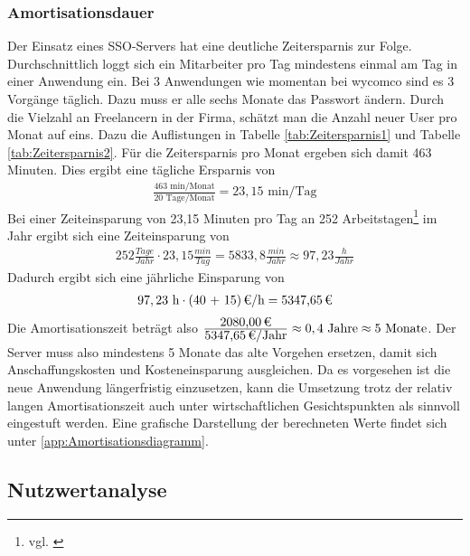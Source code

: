 \subsubsection{Amortisationsdauer}
\label{sec:Amortisationsdauer}

Der Einsatz eines \ac{SSO}-Servers hat eine deutliche Zeitersparnis zur Folge. Durchschnittlich loggt sich ein Mitarbeiter pro Tag mindestens einmal am Tag in einer Anwendung ein. Bei 3 Anwendungen wie momentan bei wycomco sind es 3 Vorgänge täglich. Dazu muss er alle sechs Monate das Passwort ändern. Durch die Vielzahl an Freelancern in der Firma, schätzt man die Anzahl neuer User pro Monat auf eins. 
Dazu die Auflistungen in Tabelle \ref{tab:Zeitersparnis1} und Tabelle \ref{tab:Zeitersparnis2}.
Für die Zeitersparnis pro Monat ergeben sich damit 463 Minuten. 
Dies ergibt eine tägliche Ersparnis von
\begin{eqnarray}
\frac{463 \mbox{ min/Monat}}{20 \mbox{ Tage/Monat}} = 23,15 \mbox{ min/Tag}
\end{eqnarray}
Bei einer Zeiteinsparung von 23,15 Minuten pro Tag an 252 Arbeitstagen\footnote{vgl. \cite{arbeitstage}} im Jahr ergibt sich eine Zeiteinsparung von 
\begin{eqnarray}
252 \frac{Tage}{Jahr} \cdot 23,15 \frac{min}{Tag} = 5833,8 \frac{min}{Jahr} \approx 97,23 \frac{h}{Jahr} 
\end{eqnarray}
Dadurch ergibt sich eine jährliche Einsparung von 
\begin{eqnarray}
97,23 \mbox{ h} \cdot \eur{(40 + 15)}{\mbox{/h}} = \eur{5347,65}
\end{eqnarray}
Die Amortisationszeit beträgt also $\frac{\eur{2080,00}}{\eur{5347,65}\mbox{/Jahr}} \approx 0,4 \mbox{ Jahre} \approx 5 \mbox{ Monate}$.
Der Server muss also mindestens 5 Monate das alte Vorgehen ersetzen, damit sich Anschaffungskosten und Kosteneinsparung ausgleichen. Da es vorgesehen ist die neue Anwendung längerfristig einzusetzen, kann die Umsetzung trotz der relativ langen Amortisationszeit auch unter wirtschaftlichen Gesichtspunkten als sinnvoll eingestuft werden.
Eine grafische Darstellung der berechneten Werte findet sich unter \ref{app:Amortisationsdiagramm}.

\subsection{Nutzwertanalyse}
\label{sec:Nutzwertanalyse}

